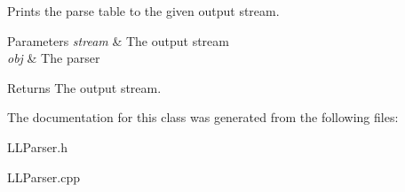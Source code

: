 Prints the parse table to the given output stream. 


\begin{DoxyParams}{Parameters}
{\em stream} & The output stream \\
\hline
{\em obj} & The parser\\
\hline
\end{DoxyParams}
\begin{DoxyReturn}{Returns}
The output stream. 
\end{DoxyReturn}


The documentation for this class was generated from the following files\-:\begin{DoxyCompactItemize}
\item 
L\-L\-Parser.\-h\item 
L\-L\-Parser.\-cpp\end{DoxyCompactItemize}
